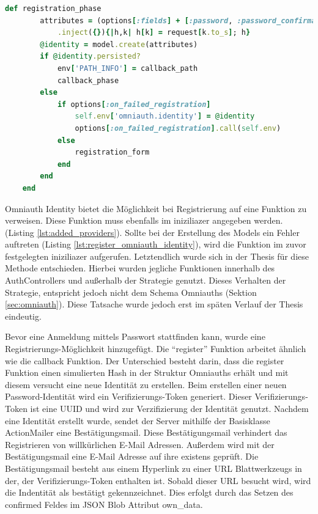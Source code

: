 \documentclass[paper=a4,fontsize=12pt,parskip=half]{scrartcl}
\begin{document}
\begin{description}
		\begin{lstlisting}[language=Ruby, style=CodeView, caption=Aufgerufene Funktion bei POST Request (Omniauth Identity), captionpos=b, label={lst:register_omniauth_identity}]
	def registration_phase
		attributes = (options[:fields] + [:password, :password_confirmation])
			.inject({}){|h,k| h[k] = request[k.to_s]; h}
		@identity = model.create(attributes)
		if @identity.persisted?
			env['PATH_INFO'] = callback_path
			callback_phase
		else
			if options[:on_failed_registration]
				self.env['omniauth.identity'] = @identity
				options[:on_failed_registration].call(self.env)
			else
				registration_form
			end
		end
	end
		\end{lstlisting}
		Omniauth Identity bietet die Möglichkeit bei Registrierung auf eine Funktion zu verweisen. Diese Funktion muss ebenfalls im iniziliazer angegeben werden. (Listing \ref{lst:added_providers}). Sollte bei der Erstellung des Models ein Fehler auftreten (Listing \ref{lst:register_omniauth_identity}), wird die Funktion im zuvor festgelegten iniziliazer aufgerufen. Letztendlich wurde sich in der Thesis für diese Methode entschieden. Hierbei wurden jegliche Funktionen innerhalb des AuthControllers und außerhalb der Strategie genutzt. Dieses Verhalten der Strategie, entspricht jedoch nicht dem Schema Omniauths (Sektion \ref{sec:omniauth}). Diese Tatsache wurde jedoch erst im späten Verlauf der Thesis eindeutig.

		Bevor eine Anmeldung mittels Passwort stattfinden kann, wurde eine Registrierungs-Möglichkeit hinzugefügt. Die \enquote{register} Funktion arbeitet ähnlich wie die callback Funktion. Der Unterschied besteht darin, dass die register Funktion einen simulierten Hash in der Struktur Omniauths erhält und mit diesem versucht eine neue Identität zu erstellen. Beim erstellen einer neuen Password-Identität wird ein Verifizierungs-Token generiert. Dieser Verifizierungs-Token ist eine \gls{UUID} und wird zur Verzifizierung der Identität genutzt. Nachdem eine Identität erstellt wurde, sendet der Server mithilfe der Basisklasse ActionMailer eine Bestätigungsmail. Diese Bestätigungsmail verhindert das Registrieren von willkürlichen E-Mail Adressen. Außerdem wird  mit der Bestätigungsmail eine E-Mail Adresse auf ihre existens geprüft. Die Bestätigungsmail besteht aus einem Hyperlink zu einer \gls{URL} Blattwerkzeugs in der, der Verifizierungs-Token enthalten ist. Sobald dieser \gls{URL} besucht wird, wird die Indentität als bestätigt gekennzeichnet. Dies erfolgt durch das Setzen des confirmed Feldes im JSON Blob Attribut own\_data.


\end{description}
\end{document}
